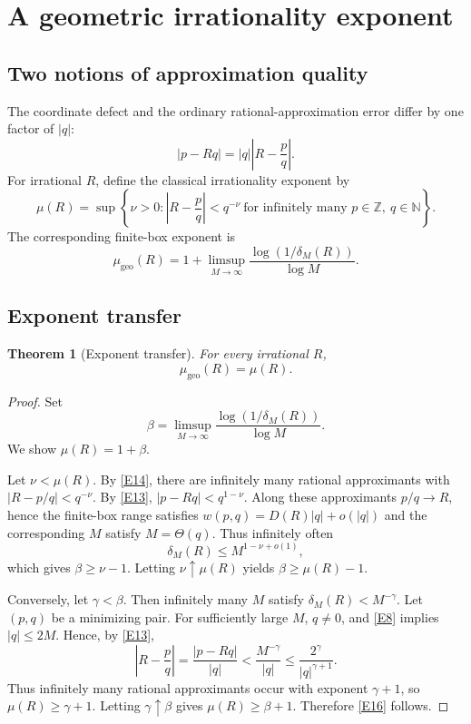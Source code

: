 \documentclass[12pt]{article}
\newtheorem{theorem}{Theorem}[section]
\newcommand{\Z}{\mathbb{Z}}
\newcommand{\N}{\mathbb{N}}
\begin{document}
\section{A geometric irrationality exponent}

\subsection{Two notions of approximation quality}
The coordinate defect and the ordinary rational-approximation error differ by one factor of $|q|$:
\begin{equation}\tag{E13}\label{E13}
|p-Rq|=|q|\left|R-\frac pq\right|.
\end{equation}
For irrational $R$, define the classical irrationality exponent by
\begin{equation}\tag{E14}\label{E14}
\mu(R)=\sup\left\{\nu>0:\left|R-\frac pq\right|<q^{-\nu}\ \text{for infinitely many }p\in\Z,\ q\in\N\right\}.
\end{equation}
The corresponding finite-box exponent is
\begin{equation}\tag{E15}\label{E15}
\mu_{\mathrm{geo}}(R)=1+\limsup_{M\to\infty}\frac{\log(1/\delta_M(R))}{\log M}.
\end{equation}

\subsection{Exponent transfer}
\begin{theorem}[Exponent transfer]
For every irrational $R$,
\begin{equation}\tag{E16}\label{E16}
\mu_{\mathrm{geo}}(R)=\mu(R).
\end{equation}
\end{theorem}

\begin{proof}
Set
\[
\beta=\limsup_{M\to\infty}\frac{\log(1/\delta_M(R))}{\log M}.
\]
We show $\mu(R)=1+\beta$.

Let $\nu<\mu(R)$. By \eqref{E14}, there are infinitely many rational approximants with
$|R-p/q|<q^{-\nu}$. By \eqref{E13},
$|p-Rq|<q^{1-\nu}$. Along these approximants $p/q\to R$, hence the finite-box range satisfies
$w(p,q)=D(R)|q|+o(|q|)$ and the corresponding $M$ satisfy $M=\Theta(q)$. Thus infinitely often
\[
\delta_M(R)\le M^{1-\nu+o(1)},
\]
which gives $\beta\ge\nu-1$. Letting $\nu\uparrow\mu(R)$ yields
$\beta\ge\mu(R)-1$.

Conversely, let $\gamma<\beta$. Then infinitely many $M$ satisfy
$\delta_M(R)<M^{-\gamma}$. Let $(p,q)$ be a minimizing pair. For sufficiently large $M$, $q\neq0$, and \eqref{E8} implies $|q|\le2M$. Hence, by \eqref{E13},
\[
\left|R-\frac pq\right|
=\frac{|p-Rq|}{|q|}
<\frac{M^{-\gamma}}{|q|}
\le\frac{2^\gamma}{|q|^{\gamma+1}}.
\]
Thus infinitely many rational approximants occur with exponent $\gamma+1$, so $\mu(R)\ge\gamma+1$. Letting $\gamma\uparrow\beta$ gives $\mu(R)\ge\beta+1$. Therefore \eqref{E16} follows.
\end{proof}
\end{document}

